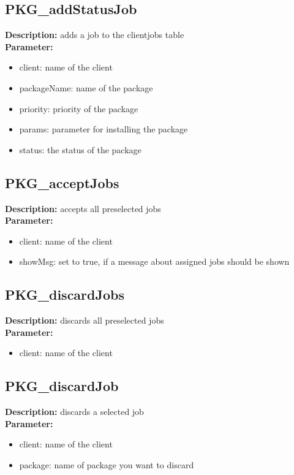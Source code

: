 \subsection{PKG\_addStatusJob}
\textbf{Description:} adds a job to the clientjobs table\\
\textbf{Parameter:}
\begin{itemize}
\item client: name of the client
\item packageName: name of the package
\item priority: priority of the package
\item params: parameter for installing the package
\item status: the status of the package
\end{itemize}

\subsection{PKG\_acceptJobs}
\textbf{Description:} accepts all preselected jobs\\
\textbf{Parameter:}
\begin{itemize}
\item client: name of the client
\item showMsg: set to true, if a message about assigned jobs should be shown
\end{itemize}

\subsection{PKG\_discardJobs}
\textbf{Description:} discards all preselected jobs\\
\textbf{Parameter:}
\begin{itemize}
\item client: name of the client
\end{itemize}

\subsection{PKG\_discardJob}
\textbf{Description:} discards a selected job\\
\textbf{Parameter:}
\begin{itemize}
\item client: name of the client
\item package: name of package you want to discard
\end{itemize}

